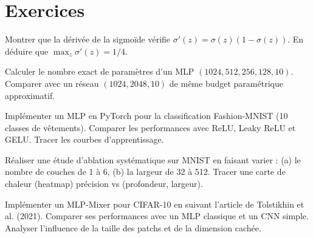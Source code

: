 \section{Exercices}

\begin{exercice}
Montrer que la d\'eriv\'ee de la sigmo\"ide v\'erifie $\sigma'(z) = \sigma(z)(1 - \sigma(z))$. En d\'eduire que $\max_z \sigma'(z) = 1/4$.
\end{exercice}

\begin{exercice}
Calculer le nombre exact de param\`etres d'un MLP $(1024, 512, 256, 128, 10)$. Comparer avec un r\'eseau $(1024, 2048, 10)$ de m\^eme budget param\'etrique approximatif.
\end{exercice}

\begin{exercice}
Impl\'ementer un MLP en PyTorch pour la classification Fashion-MNIST (10 classes de v\^etements). Comparer les performances avec ReLU, Leaky ReLU et GELU. Tracer les courbes d'apprentissage.
\end{exercice}

\begin{exercice}
R\'ealiser une \'etude d'ablation syst\'ematique sur MNIST en faisant varier : (a) le nombre de couches de 1 \`a 6, (b) la largeur de 32 \`a 512. Tracer une carte de chaleur (heatmap) pr\'ecision vs (profondeur, largeur).
\end{exercice}

\begin{exercice}
Impl\'ementer un MLP-Mixer pour CIFAR-10 en suivant l'article de Tolstikhin et al. (2021). Comparer ses performances avec un MLP classique et un CNN simple. Analyser l'influence de la taille des patchs et de la dimension cach\'ee.
\end{exercice}
